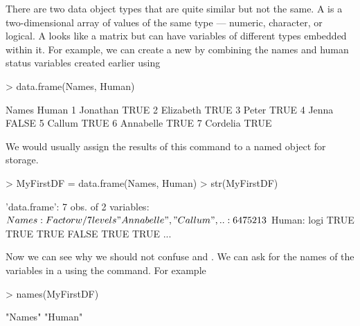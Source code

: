 There are two data object types that are quite similar but not the same. A  is a two-dimensional array of values of the same type --- numeric, character, or logical. A  looks like a matrix but can have variables of different types embedded within it. For example, we can create a new  by combining the names and human status variables created earlier using 
\begin{Schunk}
\begin{Sinput}
> data.frame(Names, Human) 
\end{Sinput}
\begin{Soutput}
      Names Human
1  Jonathan  TRUE
2 Elizabeth  TRUE
3     Peter  TRUE
4     Jenna FALSE
5    Callum  TRUE
6 Annabelle  TRUE
7  Cordelia  TRUE
\end{Soutput}
\end{Schunk}
We would usually assign the results of this command to a named object for storage. 
\begin{Schunk}
\begin{Sinput}
> MyFirstDF = data.frame(Names, Human) 
> str(MyFirstDF) 
\end{Sinput}
\begin{Soutput}
'data.frame':	7 obs. of  2 variables:
 $ Names: Factor w/ 7 levels "Annabelle","Callum",..: 6 4 7 5 2 1 3
 $ Human: logi  TRUE TRUE TRUE FALSE TRUE TRUE ...
\end{Soutput}
\end{Schunk}
 
Now we can see why we should not confuse  and . We can ask for the names of the variables in a  using the  command. For example 
\begin{Schunk}
\begin{Sinput}
> names(MyFirstDF) 
\end{Sinput}
\begin{Soutput}
[1] "Names" "Human"
\end{Soutput}
\end{Schunk}
 
